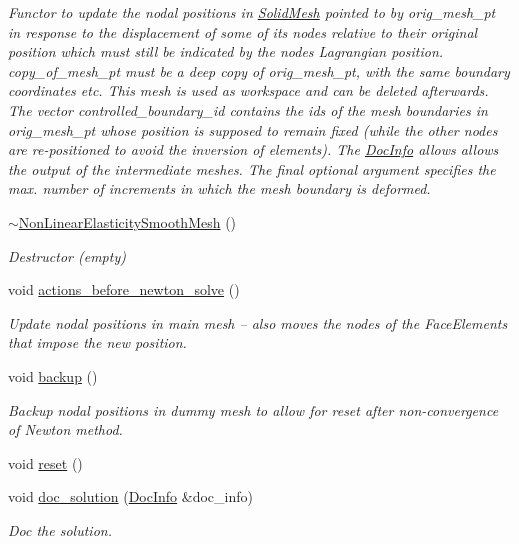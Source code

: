 \begin{DoxyCompactItemize}
\begin{DoxyCompactList}\small\item\em Functor to update the nodal positions in \hyperlink{classoomph_1_1SolidMesh}{Solid\+Mesh} pointed to by orig\+\_\+mesh\+\_\+pt in response to the displacement of some of its nodes relative to their original position which must still be indicated by the nodes\textquotesingle{} Lagrangian position. copy\+\_\+of\+\_\+mesh\+\_\+pt must be a deep copy of orig\+\_\+mesh\+\_\+pt, with the same boundary coordinates etc. This mesh is used as workspace and can be deleted afterwards. The vector controlled\+\_\+boundary\+\_\+id contains the ids of the mesh boundaries in orig\+\_\+mesh\+\_\+pt whose position is supposed to remain fixed (while the other nodes are re-\/positioned to avoid the inversion of elements). The \hyperlink{classoomph_1_1DocInfo}{Doc\+Info} allows allows the output of the intermediate meshes. The final optional argument specifies the max. number of increments in which the mesh boundary is deformed. \end{DoxyCompactList}\item 
\hyperlink{classoomph_1_1NonLinearElasticitySmoothMesh_af452c1406ac93eea7dff91ab62f74e32}{$\sim$\+Non\+Linear\+Elasticity\+Smooth\+Mesh} ()
\begin{DoxyCompactList}\small\item\em Destructor (empty) \end{DoxyCompactList}\item 
void \hyperlink{classoomph_1_1NonLinearElasticitySmoothMesh_a778763122903088b5234fcf7ca35a0b5}{actions\+\_\+before\+\_\+newton\+\_\+solve} ()
\begin{DoxyCompactList}\small\item\em Update nodal positions in main mesh -- also moves the nodes of the Face\+Elements that impose the new position. \end{DoxyCompactList}\item 
void \hyperlink{classoomph_1_1NonLinearElasticitySmoothMesh_a07ef87c5d5c74b5d9ceb23800608c87a}{backup} ()
\begin{DoxyCompactList}\small\item\em Backup nodal positions in dummy mesh to allow for reset after non-\/convergence of Newton method. \end{DoxyCompactList}\item 
void \hyperlink{classoomph_1_1NonLinearElasticitySmoothMesh_a7c6d16d244b89aece322e31cb4c83588}{reset} ()
\item 
void \hyperlink{classoomph_1_1NonLinearElasticitySmoothMesh_a47de05f2c3a8c3fb712dbdb7a1349db6}{doc\+\_\+solution} (\hyperlink{classoomph_1_1DocInfo}{Doc\+Info} \&doc\+\_\+info)
\begin{DoxyCompactList}\small\item\em Doc the solution. \end{DoxyCompactList}\end{DoxyCompactItemize}

